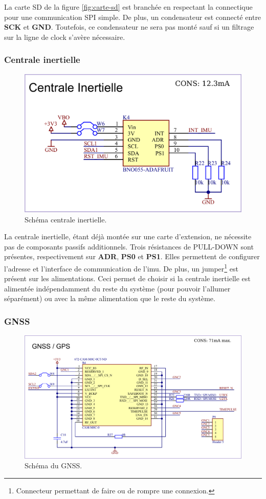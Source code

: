 La carte SD de la figure \ref{fig:carte-sd} est branchée en respectant la connectique pour une communication SPI simple. De plus, un condensateur est connecté entre \textbf{SCK} et \textbf{GND}. Toutefois, ce condensateur ne sera pas monté sauf si un filtrage sur la ligne de clock s'avère nécessaire.


\subsubsection{Centrale inertielle}

\begin{figure}[h]
	\centering
	\includegraphics[width=0.5\linewidth]{../figures/etude/sch/IMU}
	\caption{Schéma centrale inertielle.}
	\label{fig:imu}
\end{figure}

La centrale inertielle, étant déjà montée sur une carte d'extension, ne nécessite pas de composants passifs additionnels. Trois résistances de PULL-DOWN sont présentes, respectivement sur \textbf{ADR}, \textbf{PS0} et \textbf{PS1}. Elles permettent de configurer l'adresse et l'interface de communication de l'\gls{imu}. De plus, un jumper\footnote{Connecteur permettant de faire ou de rompre une connexion.} est présent sur les alimentations. Ceci permet de choisir si la centrale inertielle est alimentée indépendamment du reste du système (pour pouvoir l'allumer séparément) ou avec la même alimentation que le reste du système.


\subsubsection{GNSS}
\begin{figure}[h]
	\centering
	\includegraphics[width=.6\linewidth]{../figures/etude/sch/GNSS}
	\caption{Schéma du \gls{GNSS}.}
	\label{fig:gnss}
\end{figure}

